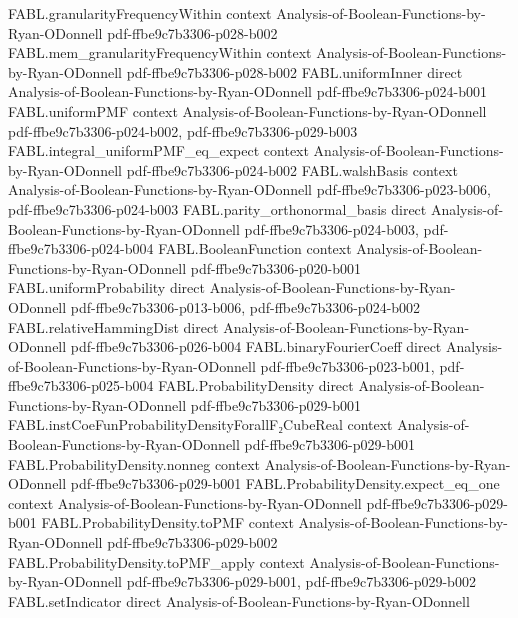 \begin{theorem}
\proofstep
  {FABL.granularityFrequencyWithin}
  {context}
  {Analysis-of-Boolean-Functions-by-Ryan-ODonnell}
  {pdf-ffbe9c7b3306-p028-b002}
\proofstep
  {FABL.mem_granularityFrequencyWithin}
  {context}
  {Analysis-of-Boolean-Functions-by-Ryan-ODonnell}
  {pdf-ffbe9c7b3306-p028-b002}
\proofstep
  {FABL.uniformInner}
  {direct}
  {Analysis-of-Boolean-Functions-by-Ryan-ODonnell}
  {pdf-ffbe9c7b3306-p024-b001}
\proofstep
  {FABL.uniformPMF}
  {context}
  {Analysis-of-Boolean-Functions-by-Ryan-ODonnell}
  {pdf-ffbe9c7b3306-p024-b002,
    pdf-ffbe9c7b3306-p029-b003}
\proofstep
  {FABL.integral_uniformPMF_eq_expect}
  {context}
  {Analysis-of-Boolean-Functions-by-Ryan-ODonnell}
  {pdf-ffbe9c7b3306-p024-b002}
\proofstep
  {FABL.walshBasis}
  {context}
  {Analysis-of-Boolean-Functions-by-Ryan-ODonnell}
  {pdf-ffbe9c7b3306-p023-b006,
    pdf-ffbe9c7b3306-p024-b003}
\proofstep
  {FABL.parity_orthonormal_basis}
  {direct}
  {Analysis-of-Boolean-Functions-by-Ryan-ODonnell}
  {pdf-ffbe9c7b3306-p024-b003,
    pdf-ffbe9c7b3306-p024-b004}
\proofstep
  {FABL.BooleanFunction}
  {context}
  {Analysis-of-Boolean-Functions-by-Ryan-ODonnell}
  {pdf-ffbe9c7b3306-p020-b001}
\proofstep
  {FABL.uniformProbability}
  {direct}
  {Analysis-of-Boolean-Functions-by-Ryan-ODonnell}
  {pdf-ffbe9c7b3306-p013-b006,
    pdf-ffbe9c7b3306-p024-b002}
\proofstep
  {FABL.relativeHammingDist}
  {direct}
  {Analysis-of-Boolean-Functions-by-Ryan-ODonnell}
  {pdf-ffbe9c7b3306-p026-b004}
\proofstep
  {FABL.binaryFourierCoeff}
  {direct}
  {Analysis-of-Boolean-Functions-by-Ryan-ODonnell}
  {pdf-ffbe9c7b3306-p023-b001,
    pdf-ffbe9c7b3306-p025-b004}
\proofstep
  {FABL.ProbabilityDensity}
  {direct}
  {Analysis-of-Boolean-Functions-by-Ryan-ODonnell}
  {pdf-ffbe9c7b3306-p029-b001}
\proofstep
  {FABL.instCoeFunProbabilityDensityForallF₂CubeReal}
  {context}
  {Analysis-of-Boolean-Functions-by-Ryan-ODonnell}
  {pdf-ffbe9c7b3306-p029-b001}
\proofstep
  {FABL.ProbabilityDensity.nonneg}
  {context}
  {Analysis-of-Boolean-Functions-by-Ryan-ODonnell}
  {pdf-ffbe9c7b3306-p029-b001}
\proofstep
  {FABL.ProbabilityDensity.expect_eq_one}
  {context}
  {Analysis-of-Boolean-Functions-by-Ryan-ODonnell}
  {pdf-ffbe9c7b3306-p029-b001}
\proofstep
  {FABL.ProbabilityDensity.toPMF}
  {context}
  {Analysis-of-Boolean-Functions-by-Ryan-ODonnell}
  {pdf-ffbe9c7b3306-p029-b002}
\proofstep
  {FABL.ProbabilityDensity.toPMF_apply}
  {context}
  {Analysis-of-Boolean-Functions-by-Ryan-ODonnell}
  {pdf-ffbe9c7b3306-p029-b001,
    pdf-ffbe9c7b3306-p029-b002}
\proofstep
  {FABL.setIndicator}
  {direct}
  {Analysis-of-Boolean-Functions-by-Ryan-ODonnell}

\end{theorem}
